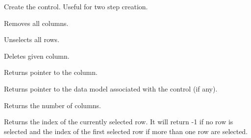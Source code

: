 
Create the control. Useful for two step creation.

\label{wxdataviewctrlclearcolumns}


Removes all columns.

\label{wxdataviewctrlclearselection}


Unselects all rows.

\label{wxdataviewctrldeletecolumn}


Deletes given column.

\label{wxdataviewctrlgetcolumn}


Returns pointer to the column.

\label{wxdataviewctrlgetmodel}


Returns pointer to the data model associated with the
control (if any).

\label{wxdataviewctrlgetcolumncount}


Returns the number of columns.

\label{wxdataviewctrlgetselection}


Returns the index of the currently selected row. It will 
return -1 if no row is selected and the index of the first
selected row if more than one row are selected.

\label{wxdataviewctrlgetselections}

